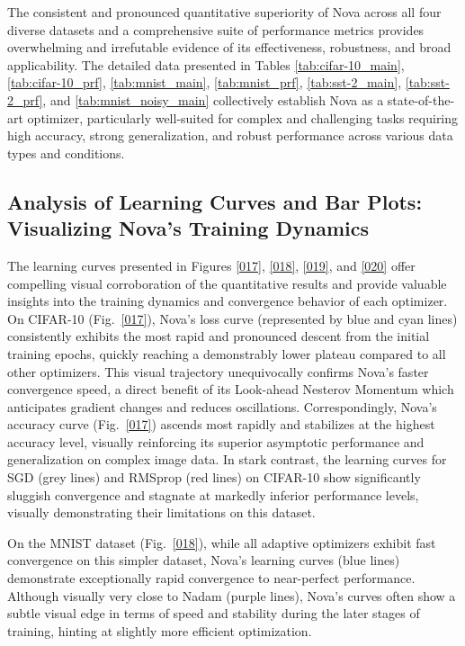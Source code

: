 \documentclass{article}
\begin{document}
The consistent and pronounced quantitative superiority of Nova across all four diverse datasets and a comprehensive suite of performance metrics provides overwhelming and irrefutable evidence of its effectiveness, robustness, and broad applicability. The detailed data presented in Tables \ref{tab:cifar-10_main}, \ref{tab:cifar-10_prf}, \ref{tab:mnist_main}, \ref{tab:mnist_prf}, \ref{tab:sst-2_main}, \ref{tab:sst-2_prf}, and \ref{tab:mnist_noisy_main} collectively establish Nova as a state-of-the-art optimizer, particularly well-suited for complex and challenging tasks requiring high accuracy, strong generalization, and robust performance across various data types and conditions.

\subsection{Analysis of Learning Curves and Bar Plots: Visualizing Nova's Training Dynamics}

The learning curves presented in Figures \ref{017}, \ref{018}, \ref{019}, and \ref{020} offer compelling visual corroboration of the quantitative results and provide valuable insights into the training dynamics and convergence behavior of each optimizer. On CIFAR-10 (Fig.~\ref{017}), Nova's loss curve (represented by blue and cyan lines) consistently exhibits the most rapid and pronounced descent from the initial training epochs, quickly reaching a demonstrably lower plateau compared to all other optimizers. This visual trajectory unequivocally confirms Nova's faster convergence speed, a direct benefit of its Look-ahead Nesterov Momentum which anticipates gradient changes and reduces oscillations. Correspondingly, Nova's accuracy curve (Fig.~\ref{017}) ascends most rapidly and stabilizes at the highest accuracy level, visually reinforcing its superior asymptotic performance and generalization on complex image data. In stark contrast, the learning curves for SGD (grey lines) and RMSprop (red lines) on CIFAR-10 show significantly sluggish convergence and stagnate at markedly inferior performance levels, visually demonstrating their limitations on this dataset.

On the MNIST dataset (Fig.~\ref{018}), while all adaptive optimizers exhibit fast convergence on this simpler dataset, Nova's learning curves (blue lines) demonstrate exceptionally rapid convergence to near-perfect performance. Although visually very close to Nadam (purple lines), Nova's curves often show a subtle visual edge in terms of speed and stability during the later stages of training, hinting at slightly more efficient optimization.
\end{document}
